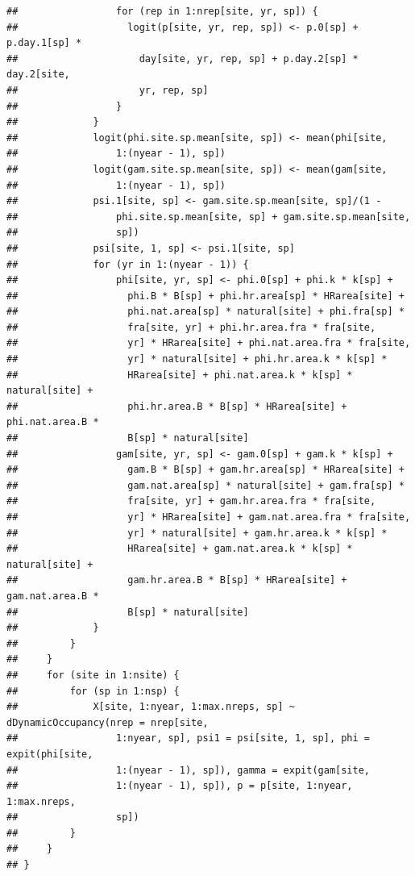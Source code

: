 \documentclass{article}\usepackage[]{graphicx}\usepackage[]{color}
\makeatletter
\newenvironment{kframe}{%
 \def\at@end@of@kframe{}%
 \ifinner\ifhmode%
  \def\at@end@of@kframe{\end{minipage}}%
  \begin{minipage}{\columnwidth}%
 \fi\fi%
 \def\FrameCommand##1{\hskip\@totalleftmargin \hskip-\fboxsep
 \colorbox{shadecolor}{##1}\hskip-\fboxsep
     \hskip-\linewidth \hskip-\@totalleftmargin \hskip\columnwidth}%
 \MakeFramed {\advance\hsize-\width
   \@totalleftmargin\z@ \linewidth\hsize
   \@setminipage}}%
 {\par\unskip\endMakeFramed%
 \at@end@of@kframe}
\newenvironment{knitrout}{}{} %
\makeatother
\begin{document}
\begin{knitrout}
\begin{kframe}
\begin{verbatim}
##                 for (rep in 1:nrep[site, yr, sp]) {
##                   logit(p[site, yr, rep, sp]) <- p.0[sp] + p.day.1[sp] * 
##                     day[site, yr, rep, sp] + p.day.2[sp] * day.2[site, 
##                     yr, rep, sp]
##                 }
##             }
##             logit(phi.site.sp.mean[site, sp]) <- mean(phi[site, 
##                 1:(nyear - 1), sp])
##             logit(gam.site.sp.mean[site, sp]) <- mean(gam[site, 
##                 1:(nyear - 1), sp])
##             psi.1[site, sp] <- gam.site.sp.mean[site, sp]/(1 - 
##                 phi.site.sp.mean[site, sp] + gam.site.sp.mean[site, 
##                 sp])
##             psi[site, 1, sp] <- psi.1[site, sp]
##             for (yr in 1:(nyear - 1)) {
##                 phi[site, yr, sp] <- phi.0[sp] + phi.k * k[sp] + 
##                   phi.B * B[sp] + phi.hr.area[sp] * HRarea[site] + 
##                   phi.nat.area[sp] * natural[site] + phi.fra[sp] * 
##                   fra[site, yr] + phi.hr.area.fra * fra[site, 
##                   yr] * HRarea[site] + phi.nat.area.fra * fra[site, 
##                   yr] * natural[site] + phi.hr.area.k * k[sp] * 
##                   HRarea[site] + phi.nat.area.k * k[sp] * natural[site] + 
##                   phi.hr.area.B * B[sp] * HRarea[site] + phi.nat.area.B * 
##                   B[sp] * natural[site]
##                 gam[site, yr, sp] <- gam.0[sp] + gam.k * k[sp] + 
##                   gam.B * B[sp] + gam.hr.area[sp] * HRarea[site] + 
##                   gam.nat.area[sp] * natural[site] + gam.fra[sp] * 
##                   fra[site, yr] + gam.hr.area.fra * fra[site, 
##                   yr] * HRarea[site] + gam.nat.area.fra * fra[site, 
##                   yr] * natural[site] + gam.hr.area.k * k[sp] * 
##                   HRarea[site] + gam.nat.area.k * k[sp] * natural[site] + 
##                   gam.hr.area.B * B[sp] * HRarea[site] + gam.nat.area.B * 
##                   B[sp] * natural[site]
##             }
##         }
##     }
##     for (site in 1:nsite) {
##         for (sp in 1:nsp) {
##             X[site, 1:nyear, 1:max.nreps, sp] ~ dDynamicOccupancy(nrep = nrep[site, 
##                 1:nyear, sp], psi1 = psi[site, 1, sp], phi = expit(phi[site, 
##                 1:(nyear - 1), sp]), gamma = expit(gam[site, 
##                 1:(nyear - 1), sp]), p = p[site, 1:nyear, 1:max.nreps, 
##                 sp])
##         }
##     }
## }
\end{verbatim}
\end{kframe}
\end{knitrout}
\end{document}
